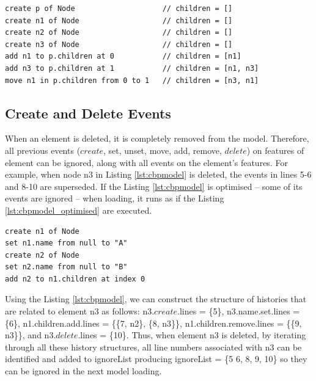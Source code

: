 {\vspace{-20pt}
\begin{lstlisting}[style=eol,caption={A naive optimised CBP representation of original CBP representation in Listing \ref{lst:add_remove_move_reference} .},label=lst:naive_add_remove_move_reference]
create p of Node                    // children = []
create n1 of Node                   // children = []
create n2 of Node                   // children = []
create n3 of Node                   // children = []
add n1 to p.children at 0           // children = [n1]
add n3 to p.children at 1           // children = [n1, n3]
move n1 in p.children from 0 to 1   // children = [n3, n1]
\end{lstlisting}

\subsection{Create and Delete Events}
\label{subsec:create_and_delete_operations}

When an element is deleted, it is completely removed from the model. Therefore, all previous events ($create$, \textsf{set}, \textsf{unset}, \textsf{move}, \textsf{add}, \textsf{remove}, $delete$) on features of element can be ignored, along with all events on the element's features. For example, when node \textsf{n3} in Listing \ref{lst:cbpmodel} is deleted, the events in lines 5-6 and 8-10 are superseded. If the Listing \ref{lst:cbpmodel} is optimised -- some of its events are ignored -- when loading, it runs as if the Listing \ref{lst:cbpmodel_optimised} are executed.

\vspace{-20pt}
\begin{lstlisting}[style=eol,caption={Change-based representation of the model in Figure \ref{fig:initial_model} after removal of node \textsf{n3}.},label=lst:cbpmodel_optimised]
create n1 of Node
set n1.name from null to "A"
create n2 of Node
set n2.name from null to "B"
add n2 to n1.children at index 0
\end{lstlisting}

Using the Listing \ref{lst:cbpmodel}, we can construct the structure of histories that are related to element \textsf{n3} as follows: \textsf{n3}.$create$.\textsf{lines} = \{5\}, \textsf{n3}.\textsf{name}.\textsf{set}.\textsf{lines} = \{6\}, \textsf{n1}.\textsf{children}.\textsf{add}.\textsf{lines} = \{\{7, \textsf{n2}\}, \{8, \textsf{n3}\}\}, \textsf{n1}.\textsf{children}.\textsf{remove}.\textsf{lines} = \{\{9, \textsf{n3}\}\}, and \textsf{n3}.$delete$.\textsf{lines} = \{10\}. Thus, when element \textsf{n3} is deleted, by iterating through all these history structures, all line numbers associated with \textsf{n3} can be identified and added to \textsf{ignoreList} producing \textsf{ignoreList} = \{5 6, 8, 9, 10\} so they can be ignored in the next model loading.

}
